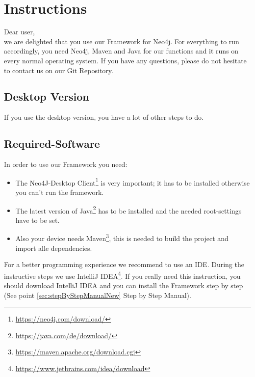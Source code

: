 \chapter{Instructions}\label{chap:zielbestimmung}
Dear user,\\
we are delighted that you use our Framework for Neo4j. For everything to run accordingly, you need Neo4j, Maven and Java for our functions and it runs on every normal operating system.
If you have any questions, please do not hesitate to contact us on our \glqq Git Repository\grqq{}.

\section{Desktop Version} \label{sec:desktop}
If you use the desktop version, you have a lot of other steps to do.

\section{Required-Software}\label{sec:neededsoftwareNew}
In order to use our Framework you need:
\begin{itemize}
	\item The Neo4J-Desktop Client\footnote{\url{https://neo4j.com/download/}} is very important; it has to be installed otherwise you can't run the framework.
	\item The latest version of Java\footnote{\url{https://java.com/de/download/}} has to be installed and the needed root-settings have to be set.
	\item Also your device needs Maven\footnote{\url{https://maven.apache.org/download.cgi}}, this is needed to build the project and import alle dependencies{}.
\end{itemize}
For a better programming experience we recommend to use an IDE. During the instructive steps we use IntelliJ IDEA\footnote{\url{https://www.jetbrains.com/idea/download}}. If you really need this instruction, you should download IntelliJ IDEA and you can install the Framework step by step (See point \ref{sec:stepByStepManualNew} Step by Step Manual).

\newpage

